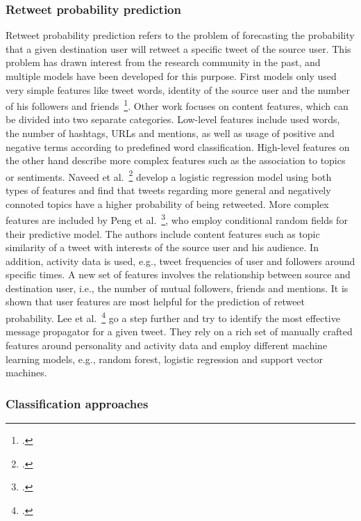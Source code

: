 \subsubsection{Retweet probability prediction}

Retweet probability prediction refers to the problem of forecasting the
probability that a given destination user will retweet a specific tweet of
the source user.
This problem has drawn interest from the research community in the past, and
multiple models have been developed for this purpose.
First models only used very simple features like tweet words, identity of the
source user and the number of his followers and friends~\footcite{Zaman2010}.
Other work focuses on content features, which can be divided into two separate
categories.
Low-level features include used words, the number of hashtags, URLs and mentions,
as well as usage of positive and negative terms according to predefined word 
classification.
High-level features on the other hand describe more complex features such as
the association to topics or sentiments.
Naveed et al.~\footcite{Naveed2011} develop a logistic regression model using
both types of features and find that tweets regarding more general and 
negatively connoted topics have a higher probability of being retweeted.
More complex features are included by Peng et al.~\footcite{Peng2011},
who employ conditional random fields for their predictive model.
The authors include content features such as topic similarity of a tweet with 
interests of the source user and his audience.
In addition, activity data is used, e.g., tweet frequencies of user and
followers around specific times.
A new set of features involves the relationship between source and destination
user, i.e., the number of mutual followers, friends and mentions.
It is shown that user features are most helpful for the prediction of
retweet probability.
Lee et al.~\footcite{Lee2014} go a step further and try to identify the most
effective message propagator for a given tweet.
They rely on a rich set of manually crafted features around personality and activity data
and employ different machine learning models, e.g., random forest, logistic
regression and support vector machines.

\subsubsection{Classification approaches}

